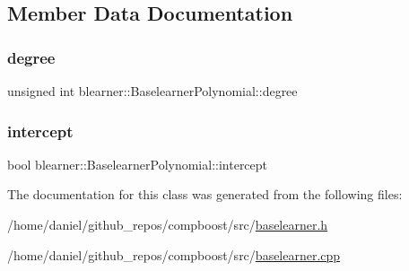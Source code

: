 \subsection{Member Data Documentation}
\mbox{\label{classblearner_1_1_baselearner_polynomial_a6841e90a66b12f3f345f6e563df78baf}} 
\subsubsection{\texorpdfstring{degree}{degree}}
{\footnotesize\ttfamily unsigned int blearner\+::\+Baselearner\+Polynomial\+::degree\hspace{0.3cm}{\ttfamily [private]}}

\mbox{\label{classblearner_1_1_baselearner_polynomial_af72326177abcf1fae10a32f9dfdd6a6e}} 
\subsubsection{\texorpdfstring{intercept}{intercept}}
{\footnotesize\ttfamily bool blearner\+::\+Baselearner\+Polynomial\+::intercept\hspace{0.3cm}{\ttfamily [private]}}



The documentation for this class was generated from the following files\+:\begin{DoxyCompactItemize}
\item 
/home/daniel/github\+\_\+repos/compboost/src/\hyperlink{baselearner_8h}{baselearner.\+h}\item 
/home/daniel/github\+\_\+repos/compboost/src/\hyperlink{baselearner_8cpp}{baselearner.\+cpp}\end{DoxyCompactItemize}
